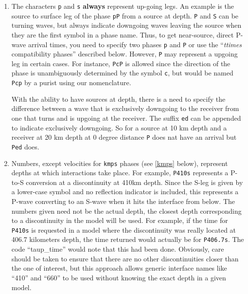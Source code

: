 \begin{enumerate}
\item \label{Ped} The characters \texttt{p} and \texttt{s} \textbf{always} represent 
up-going legs. 
An example is the source to surface leg of the phase \texttt{pP}
from a source at depth. 
\texttt{P} and \texttt{S} can be turning waves, but 
always indicate downgoing waves leaving the source when they are the first symbol in a
phase name.
Thus, to get near-source, direct P-wave arrival times, you need to specify two
phases \texttt{p} and \texttt{P} or use the ``\textit{ttimes} compatibility phases'' described
below.
However, \texttt{P} may
represent a upgoing leg in certain cases.  
For instance, \texttt{PcP} is 
allowed since the direction of the phase is unambiguously determined by the symbol
\texttt{c}, but would be named \texttt{Pcp} by a purist using our nomenclature.

With the ability to have sources at depth, there is a need to specify the difference between a wave that is
exclusively downgoing to the receiver from one that turns and is upgoing at the receiver. The suffix \texttt{ed}
can be appended to indicate exclusively downgoing. So for a source at 10 km depth and a receiver at 20 km depth
at 0 degree distance \texttt{P} does nat have an arrival but \texttt{Ped} does.

\item Numbers, except velocities for \texttt{kmps} 
phases (see \ref{kmps} below), 
represent depths at which interactions take place. 
For example, \texttt{P410s} represents a P-to-S conversion at a discontinuity at 410km
depth.  
Since the S-leg is given by a lower-case symbol and no reflection indicator is
included, this represents a P-wave  converting to an S-wave when it hits the interface
from below.
The numbers given need not be the actual depth, the closest depth corresponding to a 
discontinuity in the model will be used. 
For example, if the time for \texttt{P410s} is requested in a model where the discontinuity 
was really located at 406.7 kilometers depth, the time returned would actually be for
\texttt{P406.7s}.
The code ``taup\_time'' would note that this had been done.
Obviously, care should be taken to ensure that there are no other discontinuities 
closer than the one of interest, but this approach allows generic interface
names like ``410'' and ``660'' to be used without knowing the exact depth in a given
model.


\end{enumerate}
